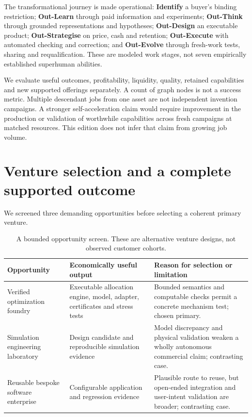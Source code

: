 \documentclass[11pt,letterpaper]{article}
\begin{document}
The transformational journey is made operational: \textbf{Identify} a buyer's binding restriction; \textbf{Out-Learn} through paid information and experiments; \textbf{Out-Think} through grounded representations and hypotheses; \textbf{Out-Design} an executable product; \textbf{Out-Strategise} on price, cash and retention; \textbf{Out-Execute} with automated checking and correction; and \textbf{Out-Evolve} through fresh-work tests, sharing and requalification. These are modeled work stages, not seven empirically established superhuman abilities.

We evaluate useful outcomes, profitability, liquidity, quality, retained capabilities and new supported offerings separately. A count of graph nodes is not a success metric. Multiple descendant jobs from one asset are not independent invention campaigns. A stronger self-acceleration claim would require improvement in the production or validation of worthwhile capabilities across fresh campaigns at matched resources. This edition does not infer that claim from growing job volume.

\section{Venture selection and a complete supported outcome}
We screened three demanding opportunities before selecting a coherent primary venture.
\begin{table}[htbp]\centering\small
\begin{tabularx}{\linewidth}{@{}p{.22\linewidth}YY@{}}\toprule
Opportunity & Economically useful output & Reason for selection or limitation \\\midrule
Verified optimization foundry & Executable allocation engine, model, adapter, certificates and stress tests & Bounded semantics and computable checks permit a concrete mechanism test; chosen primary. \\
Simulation engineering laboratory & Design candidate and reproducible simulation evidence & Model discrepancy and physical validation weaken a wholly autonomous commercial claim; contrasting case. \\
Reusable bespoke software enterprise & Configurable application and regression evidence & Plausible route to reuse, but open-ended integration and user-intent validation are broader; contrasting case. \\\bottomrule
\end{tabularx}
\caption{A bounded opportunity screen. These are alternative venture designs, not observed customer cohorts.}
\end{table}
\end{document}
